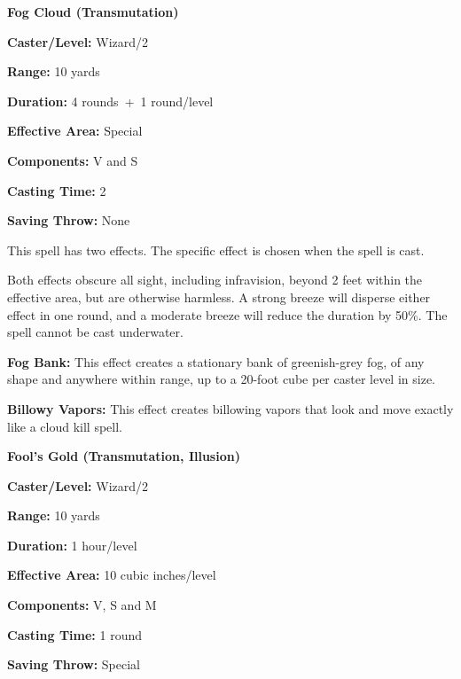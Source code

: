 \begin{multicols}{2}
\vspace{1em}

\noindent
\begin{minipage}{\columnwidth}

\noindent \textbf{Fog Cloud (Transmutation)}

\noindent \textbf{Caster/Level:} Wizard/2

\noindent \textbf{Range:} 10 yards

\noindent \textbf{Duration:} 4 rounds~+~1 round/level

\noindent \textbf{Effective Area:} Special

\noindent \textbf{Components:} V and S

\noindent \textbf{Casting Time:} 2

\noindent \textbf{Saving Throw:} None

\end{minipage}

This spell has two effects.  The specific effect is chosen when the spell is cast. 

Both effects obscure all sight, including infravision, beyond 2 feet within the effective area, but are otherwise harmless.  A strong breeze will disperse either effect in one round, and a moderate breeze will reduce the duration by 50\%.  The spell cannot be cast underwater.

\textbf{Fog Bank:} This effect creates a stationary bank of greenish-grey fog, of any shape and anywhere within range, up to a 20-foot cube per caster level in size. 

\textbf{Billowy Vapors:} This effect creates billowing vapors that look and move exactly like a cloud kill spell.  

\vspace{1em}

\noindent
\begin{minipage}{\columnwidth}

\noindent \textbf{Fool's Gold (Transmutation, Illusion)}

\noindent \textbf{Caster/Level:} Wizard/2

\noindent \textbf{Range:} 10 yards

\noindent \textbf{Duration:} 1 hour/level

\noindent \textbf{Effective Area:} 10 cubic inches/level

\noindent \textbf{Components:} V, S and M

\noindent \textbf{Casting Time:} 1 round

\noindent \textbf{Saving Throw:} Special


\end{minipage}
\end{multicols}
